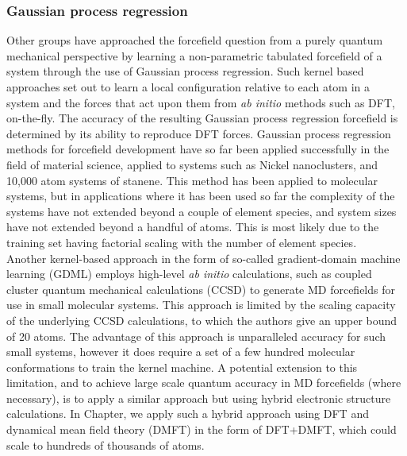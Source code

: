 \subsubsection{Gaussian process regression}
Other groups have approached the forcefield question from a purely quantum mechanical perspective by learning a non-parametric tabulated forcefield of a system through the use of Gaussian process regression.\cite{zeni2018building, bartok2010gaussian, Vandermause2020} Such kernel based approaches set out to learn a local configuration relative to each atom in a system and the forces that act upon them from \textit{ab initio} methods such as DFT, on-the-fly. The accuracy of the resulting Gaussian process regression forcefield is determined by its ability to reproduce DFT forces. Gaussian process regression methods for forcefield development have so far been applied successfully in the field of material science, applied to systems such as Nickel nanoclusters,\cite{glielmo2018efficient} and 10,000 atom systems of stanene.\cite{xie2021bayesian} This method has been applied to molecular systems, but in applications where it has been used so far the complexity of the systems have not extended beyond a couple of element species, and system sizes have not extended beyond a handful of atoms.\cite{Uteva2018, cui2016efficient} This is most likely due to the training set having factorial scaling with the number of element species.\cite{glielmo2020building} \\

Another kernel-based approach in the form of so-called gradient-domain machine learning (GDML) employs high-level \textit{ab initio} calculations, such as coupled cluster quantum mechanical calculations (CCSD) to generate MD forcefields for use in small molecular systems. This approach is limited by the scaling capacity of the underlying CCSD calculations, to which the authors give an upper bound of 20 atoms.\cite{chmiela2018towards} The advantage of this approach is unparalleled accuracy for such small systems, however it does require a set of a few hundred molecular conformations to train the kernel machine. A potential extension to this limitation, and to achieve large scale quantum accuracy in MD forcefields (where necessary), is to apply a similar approach but using hybrid electronic structure calculations. In Chapter, we apply such a hybrid approach using DFT and dynamical mean field theory (DMFT) in the form of DFT+DMFT, which could scale to hundreds of thousands of atoms. 

